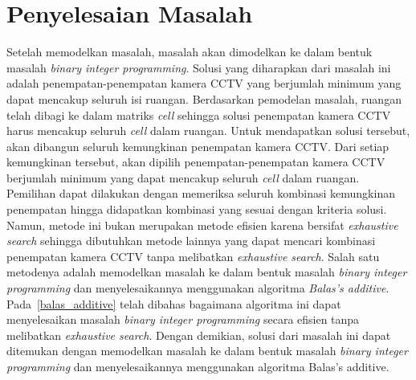 \section{Penyelesaian Masalah}
Setelah memodelkan masalah, masalah akan dimodelkan ke dalam bentuk masalah \textit{binary integer programming}. Solusi yang diharapkan dari masalah ini adalah penempatan-penempatan kamera CCTV yang berjumlah minimum yang dapat mencakup seluruh isi ruangan. Berdasarkan pemodelan masalah, ruangan telah dibagi ke dalam matriks \textit{cell} sehingga solusi penempatan kamera CCTV harus mencakup seluruh \textit{cell} dalam ruangan. 
Untuk mendapatkan solusi tersebut, akan dibangun seluruh kemungkinan penempatan kamera CCTV. Dari setiap kemungkinan tersebut, akan dipilih penempatan-penempatan kamera CCTV berjumlah minimum yang dapat mencakup seluruh \textit{cell} dalam ruangan. Pemilihan dapat dilakukan dengan memeriksa seluruh kombinasi kemungkinan penempatan hingga didapatkan kombinasi yang sesuai dengan kriteria solusi. Namun, metode ini bukan merupakan metode efisien karena bersifat \textit{exhaustive search} sehingga dibutuhkan metode lainnya yang dapat mencari kombinasi penempatan kamera CCTV tanpa melibatkan \textit{exhaustive search}. Salah satu metodenya adalah memodelkan masalah ke dalam bentuk masalah \textit{binary integer programming} dan menyelesaikannya menggunakan algoritma \textit{Balas's additive}. Pada~\ref{balas_additive} telah dibahas bagaimana algoritma ini dapat menyelesaikan masalah \textit{binary integer programming} secara efisien tanpa melibatkan \textit{exhaustive search}. Dengan demikian, solusi dari masalah ini dapat ditemukan dengan memodelkan masalah ke dalam bentuk masalah \textit{binary integer programming} dan menyelesaikannya menggunakan algoritma Balas's additive.


